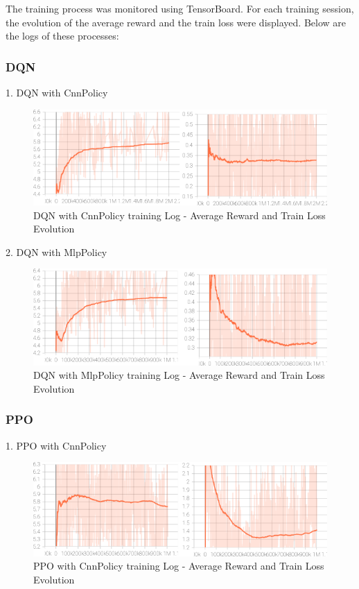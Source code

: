 The training process was monitored using TensorBoard. 
For each training session, the evolution of the average reward and the train loss were displayed. 
Below are the logs of these processes:


\subsubsection{DQN}

1. DQN with CnnPolicy

\begin{figure}[H]
    \centering
    \includegraphics[height=0.20\textheight]{images/dqn_cnn.png} 
    \caption{DQN with CnnPolicy training Log - Average Reward and Train Loss Evolution}
\end{figure}



2. DQN with MlpPolicy

\begin{figure}[H]
    \centering
    \includegraphics[height=0.20\textheight]{images/dqn_mlp.png} 
    \caption{DQN with MlpPolicy training Log - Average Reward and Train Loss Evolution}
\end{figure}

\subsubsection{PPO}

1. PPO with CnnPolicy

\begin{figure}[H]
    \centering
    \includegraphics[height=0.20\textheight]{images/ppo_cnn.png} 
    \caption{PPO with CnnPolicy training Log - Average Reward and Train Loss Evolution}
\end{figure}



